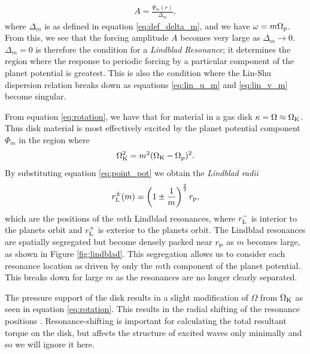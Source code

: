 \begin{align}
    A = \frac{\Psi_m (r)}{\Delta_m},
\end{align}
where $\Delta_m$ is as defined in equation \ref{eq:def_delta_m}, and we have $\omega = m \Omega_{\rm p} $.
From this, we see that the forcing amplitude $A$ becomes very large as $\Delta_m \rightarrow 0$.
$\Delta_m = 0$ is therefore the condition for a \textit{Lindblad Resonance}; it determines the region where the response to periodic forcing by a particular component of the planet potential is greatest.
This is also the condition where the Lin-Shu dispersion relation breaks down as equations \ref{eq:lin_u_m} and \ref{eq:lin_v_m} become singular.

From equation \ref{eq:rotation}, we have that for material in a gas disk $\kappa = \Omega \approx \Omega_{\rm K}$.
Thus disk material is most effectively excited by the planet potential component $\Phi_m$ in the region where
\begin{align}
    \Omega_{\rm K}^2 = m^2 (\Omega_{\rm K} - \Omega_{\rm p})^2.
\end{align}
By substituting equation \ref{eq:point_pot} we obtain the \textit{Lindblad radii}
\begin{align}
    r_{\rm L}^\pm(m) = \left( 1 \pm \frac{1}{m} \right)^\frac{2}{3} r_{\rm p}, \label{eq:lind_loc}
\end{align}
which are the positions of the $m$th Lindblad resonances, where $r_{\rm L}^-$ is interior to the planets orbit and $r_{\rm L}^+$ is exterior to the planets orbit.
The Lindblad resonances are spatially segregated but become densely packed near $r_{\rm p}$ as $m$ becomes large, as shown in Figure \ref{fig:lindblad}.
This segregation allows us to consider each resonance location as driven by only the $m$th component of the planet potential.
This breaks down for large $m$ as the resonances are no longer clearly separated.

The pressure support of the disk results in a slight modification of $\Omega$ from $\Omega_{\rm K}$ as seen in equation \ref{eq:rotation}.
This results in the radial shifting of the resonance positions \citep{artymowicz1993a}.
Resonance-shifting is important for calculating the total resultant torque on the disk, but affects the structure of excited waves only minimally and so we will ignore it here.

